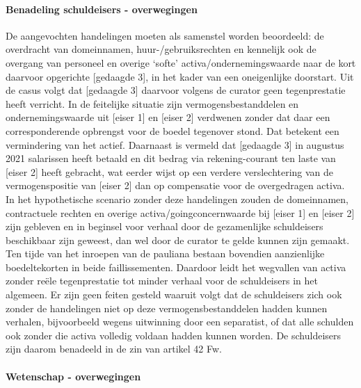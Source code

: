 \documentclass[
  dutch,
  a4paper,
]{article}
\begin{document}
\paragraph{Benadeling schuldeisers - overwegingen}\label{benadeling-schuldeisers---overwegingen-19}

De aangevochten handelingen moeten als samenstel worden beoordeeld: de overdracht van domeinnamen, huur-/gebruiksrechten en kennelijk ook de overgang van personeel en overige `softe' activa/ondernemingswaarde naar de kort daarvoor opgerichte {[}gedaagde 3{]}, in het kader van een oneigenlijke doorstart. Uit de casus volgt dat {[}gedaagde 3{]} daarvoor volgens de curator geen tegenprestatie heeft verricht. In de feitelijke situatie zijn vermogensbestanddelen en ondernemingswaarde uit {[}eiser 1{]} en {[}eiser 2{]} verdwenen zonder dat daar een corresponderende opbrengst voor de boedel tegenover stond. Dat betekent een vermindering van het actief. Daarnaast is vermeld dat {[}gedaagde 3{]} in augustus 2021 salarissen heeft betaald en dit bedrag via rekening-courant ten laste van {[}eiser 2{]} heeft gebracht, wat eerder wijst op een verdere verslechtering van de vermogenspositie van {[}eiser 2{]} dan op compensatie voor de overgedragen activa. In het hypothetische scenario zonder deze handelingen zouden de domeinnamen, contractuele rechten en overige activa/goingconcernwaarde bij {[}eiser 1{]} en {[}eiser 2{]} zijn gebleven en in beginsel voor verhaal door de gezamenlijke schuldeisers beschikbaar zijn geweest, dan wel door de curator te gelde kunnen zijn gemaakt. Ten tijde van het inroepen van de pauliana bestaan bovendien aanzienlijke boedeltekorten in beide faillissementen. Daardoor leidt het wegvallen van activa zonder reële tegenprestatie tot minder verhaal voor de schuldeisers in het algemeen. Er zijn geen feiten gesteld waaruit volgt dat de schuldeisers zich ook zonder de handelingen niet op deze vermogensbestanddelen hadden kunnen verhalen, bijvoorbeeld wegens uitwinning door een separatist, of dat alle schulden ook zonder die activa volledig voldaan hadden kunnen worden. De schuldeisers zijn daarom benadeeld in de zin van artikel 42 Fw.

\paragraph{Wetenschap - overwegingen}\label{wetenschap---overwegingen-19}
\end{document}
